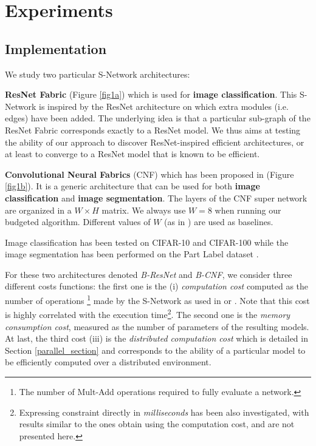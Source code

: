 \documentclass[10pt,twocolumn,letterpaper]{article}
\begin{document}
\section{Experiments}\label{section_experiments}

\subsection{Implementation}\label{implem}

We study two particular S-Network architectures:

\textbf{ResNet Fabric} (Figure \ref{fig1a}) which is used for \textbf{image classification}. This S-Network is inspired by the ResNet\cite{DBLP:journals/corr/HeZRS15} architecture on which extra modules (i.e. edges) have been added. The underlying idea is that a particular sub-graph of the ResNet Fabric corresponds exactly to a ResNet model. We thus aims at testing the ability of our approach to discover ResNet-inspired efficient architectures, or at least to converge to a ResNet model that is known to be efficient.

\textbf{Convolutional Neural Fabrics} (CNF) which has been proposed in \cite{DBLP:journals/corr/SaxenaV16} (Figure \ref{fig1b}). It is a generic architecture that can be used for both \textbf{image classification} and \textbf{image segmentation}. The layers of the CNF super network are organized in a $W \times H$ matrix. We always use $W=8$ when running our budgeted algorithm. Different values of $W$ (as in \cite{DBLP:journals/corr/SaxenaV16}) are used as baselines. 

Image classification has been tested on CIFAR-10 and CIFAR-100 \cite{Krizhevsky09learningmultiple} while the image segmentation has been performed on the Part Label dataset \cite{GLOC_CVPR13}. 

For these two architectures denoted \textit{B-ResNet} and \textit{B-CNF}, we consider three different costs functions: the first one is the (i) \textit{computation cost} computed as the number of operations \footnote{The number of Mult-Add operations required to fully evaluate a network.} made by the S-Network as used in \cite{DBLP:journals/corr/DongHYY17} or \cite{DBLP:journals/corr/HuangCLWMW17}. Note that this cost is highly correlated with the execution time\footnote{Expressing constraint directly in \textit{milliseconds} has been also investigated, with results similar to the ones obtain using the computation cost, and are not presented here.}. The second one is the \textit{memory consumption cost}, measured as the number of parameters of the resulting models. At last, the third cost (iii) is the \textit{distributed computation cost} which is detailed in Section \ref{parallel_section} and corresponds to the ability of a particular model to be efficiently computed over a distributed environment. 
\end{document}
